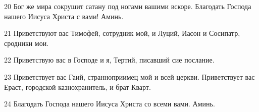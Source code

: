 \par 20 Бог же мира сокрушит сатану под ногами вашими вскоре. Благодать Господа нашего Иисуса Христа с вами! Аминь.
\par 21 Приветствуют вас Тимофей, сотрудник мой, и Луций, Иасон и Сосипатр, сродники мои.
\par 22 Приветствую вас в Господе и я, Тертий, писавший сие послание.
\par 23 Приветствует вас Гаий, странноприимец мой и всей церкви. Приветствует вас Ераст, городской казнохранитель, и брат Кварт.
\par 24 Благодать Господа нашего Иисуса Христа со всеми вами. Аминь.


